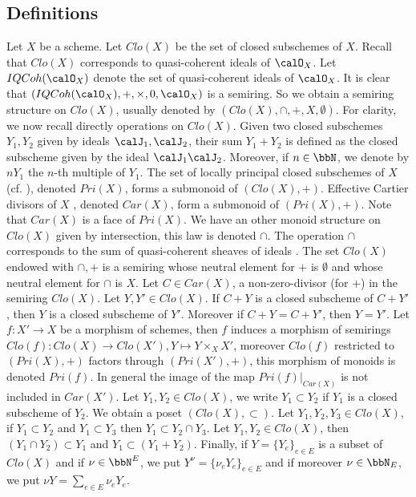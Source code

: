 \documentclass[10pt]{alggeom}
\theoremstyle{definition}
\numberwithin{equation}{section}
\begin{document}
\subsection{Definitions}\label{blow.up.definition.sec}
Let $X$ be a scheme. 
Let $Clo (X)$ be the set of closed subschemes of $X$. Recall that $Clo(X)$ corresponds to quasi-coherent ideals of $\calO _X$. Let $IQCoh(\calO _X)$ denote the set of quasi-coherent ideals of $\calO _X$. It is clear that $(IQCoh(\calO _X), +, \times , 0 , \calO _X)$ is a semiring. So we obtain a semiring structure on $Clo (X)$, usually denoted by $(Clo(X), \cap , + , X, \emptyset)$. For clarity, we now recall directly operations on $Clo(X)$.
Given two closed subschemes $Y_1,Y_2$ given by ideals $\calJ _1 , \calJ_2$, their sum $Y_1+Y_2$ is defined as the closed subscheme given by the ideal $\calJ_1 \calJ_2$. Moreover, if  $n \in \bbN$, we denote by $nY_1$ the $n$-th multiple of $Y_1$.  The set of locally principal closed subschemes of $X$ (cf. \cite[\href{https://stacks.math.columbia.edu/tag/01WR}{Tag 01WR}]{stacks-project}), denoted $Pri(X)$, forms a submonoid of $(Clo(X),+)$. Effective Cartier divisors of $X$ \cite[\href{https://stacks.math.columbia.edu/tag/01WR}{Tag 01WR}]{stacks-project}, denoted $Car(X)$, form a submonoid of $(Pri (X),+)$. Note that $Car(X)$ is a face of $Pri(X)$. We have an other monoid structure on $Clo (X)$ given by intersection, this law is denoted $\cap$. The operation $\cap$ corresponds to the sum of quasi-coherent sheaves of ideals . The set $Clo(X)$ endowed with $ \cap, +$ is a semiring whose neutral element for $+$ is $\emptyset$ and whose neutral element for $\cap$ is $X$. Let $C \in Car(X) $, a non-zero-divisor (for $+$) in the semiring $Clo(X)$. Let $Y,Y' \in Clo (X)$. If $C+Y$ is a closed subscheme of $C+Y'$, then $Y $ is a closed subscheme of $Y'$. Moreover if $C+Y=C+Y'$, then $Y=Y'$. Let $f:X' \to X$ be a morphism of schemes, then $f$ induces a morphism of semirings $Clo(f) : Clo (X) \to Clo (X'), Y \mapsto Y \times _X X'$, moreover $Clo(f) $ restricted to $(Pri (X),+)$ factors through $(Pri(X'),+)$, this morphism of monoids is denoted $Pri (f)$. In general the image of the map $Pri(f) |_{Car(X)}$ is not included in $Car (X'). $ Let $Y_1,Y_2 \in Clo(X)$, we write $Y_1 \subset Y_2$ if $Y_1 $ is a closed subscheme of $Y_2$. We obtain a poset $(Clo(X), \subset)$. Let $Y_1,Y_2,Y_3 \in Clo(X)$, if $Y_1 \subset Y_2 $ and $Y_1 \subset Y_3$ then $Y_1 \subset Y_2 \cap Y_3$. Let $Y_1,Y_2 \in Clo (X)$, then $(Y_1 \cap Y_2) \subset Y_1$ and $Y_1 \subset ( Y_1+Y_2)$.
Finally, if $Y=\{ Y_e \} _{e \in E}$ is a subset of $Clo (X)$ and if $\nu \in \bbN ^{E}$, we put $Y^\nu = \{\nu _e Y_e  \}_{e \in E}$ and if moreover $\nu \in \bbN _E$, we put $\nu Y = \sum _{e \in E } \nu _e Y_e$.
\end{document}
